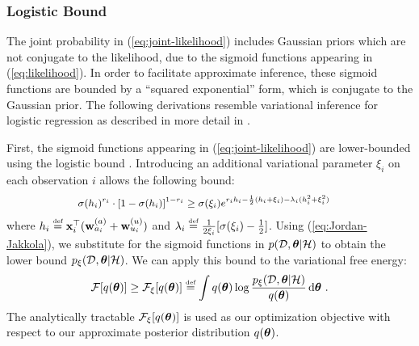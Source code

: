 \subsubsection{Logistic Bound}
The joint probability in (\ref{eq:joint-likelihood}) includes Gaussian priors which are not conjugate to the likelihood, due to the sigmoid functions appearing in (\ref{eq:likelihood}).
In order to facilitate approximate inference, these sigmoid functions are bounded by a ``squared exponential'' form, which is conjugate to the Gaussian prior. 
The following derivations resemble variational inference for logistic regression as described in more detail in \cite{LogisticBound}.

First, the sigmoid functions appearing in (\ref{eq:joint-likelihood}) are lower-bounded using the logistic bound \cite{VB_Methods}.
Introducing an additional variational parameter $\xi_i$ on each observation $i$ allows the following bound:
\begin{equation}
\begingroup\makeatletter\def\f@size{\fsize}\check@mathfonts
\def\maketag@@@#1{\hbox{\m@th\large\normalfont#1}}%
\begin{aligned}
& \sigma(h_i)^{r_i} \cdot \left[ 1- \sigma(h_i)\right]^{1-r_i} \geq  \sigma(\xi_i) e^{r_ih_i-\frac{1}{2}(h_i+\xi_i)-\lambda_i(h_i^2+\xi_i^2)}
\label{eq:Jordan-Jakkola}
\end{aligned}\endgroup
\end{equation} 
where $h_i \defined \x_i^\top ( \w^{(a)}_{a_i} + \w^{(u)}_{u_i} )$ and
$\lambda_i \defined \frac{1}{2 \xi_i} [ \sigma(\xi_i)-\frac{1}{2} ]$.
Using (\ref{eq:Jordan-Jakkola}), we substitute for the sigmoid functions in $p(\mathcal{D}, \bm{\theta} | \mathcal{H})$
to obtain the lower bound $p_{\xi}(\mathcal{D}, \bm{\theta} | \mathcal{H})$.
We can apply this bound to the variational free energy:
\[
\mathcal{F}[ q(\btheta)] \geq \mathcal{F}_{\xi}[ q(\btheta)] \defined  \int q(\btheta) \log \frac{p_{\xi}(\mathcal{D}, \btheta  | \mathcal{H})}{q(\btheta)} \, \mathrm{d} \btheta \ .
\]
The analytically tractable $\mathcal{F}_{\xi}[ q(\bm{\theta})]$ is used as our optimization objective with respect to our approximate posterior distribution $q(\bm{\theta})$. 


